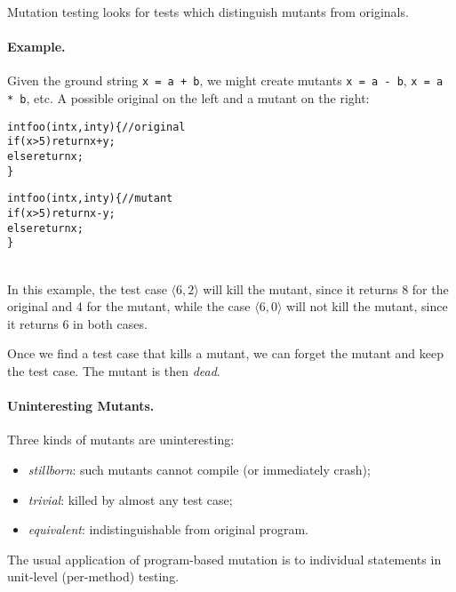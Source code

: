 \documentclass[11pt]{article}
\begin{document}
Mutation testing looks for tests which distinguish mutants from
originals.

\newpage
\paragraph{Example.} Given the ground string {\tt x = a + b},
we might create mutants {\tt x = a - b}, {\tt x = a * b}, etc.
A possible original on the
left and a mutant on the right:

\begin{minipage}{.5\textwidth} 
\begin{alltt}
int foo(int x, int y) \{ // original
  if (x > 5) return x + y;
  else return x;
\}
\end{alltt}
\end{minipage}\begin{minipage}{.5\textwidth}
\begin{alltt}
int foo(int x, int y) \{ // mutant
  if (x > 5) return x - y;
  else return x;
\}
\end{alltt}
\end{minipage}
~\\[3em]
In this example, the test case $\langle 6, 2 \rangle$ will kill
 the mutant, since it returns 8 for the original and 4 for the mutant,
while the case $\langle 6, 0 \rangle$ will not kill the mutant,
since it returns 6 in both cases.

Once we find a test case that kills a mutant, we can forget the
mutant and keep the test case. The mutant is then \emph{dead}.

\paragraph{Uninteresting Mutants.} Three kinds of mutants are uninteresting:
\begin{itemize}[noitemsep]
\item \emph{stillborn}: such mutants cannot compile (or immediately crash);
\item \emph{trivial}: killed by almost any test case;
\item \emph{equivalent}: indistinguishable from original program.
\end{itemize}

The usual application of program-based mutation is to individual statements
in unit-level (per-method) testing.



\end{document}
